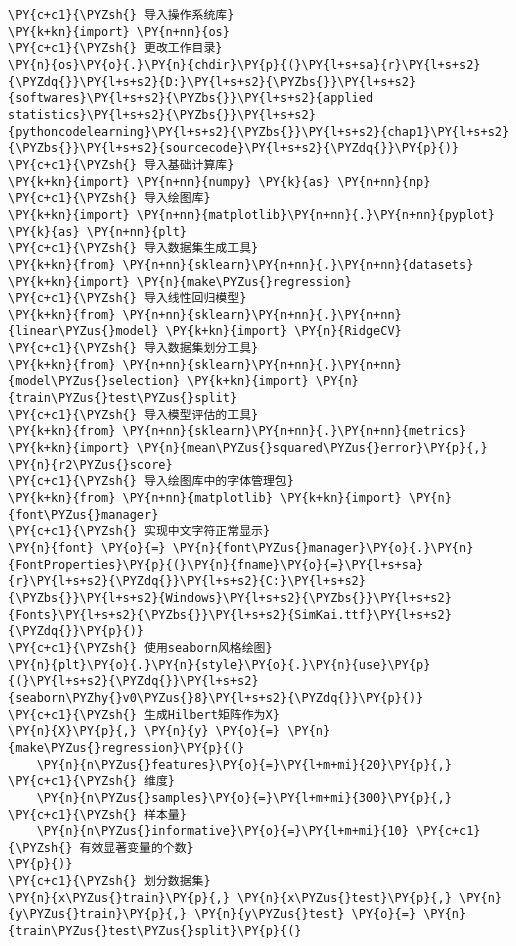 \begin{Verbatim}[commandchars=\\\{\}]
\PY{c+c1}{\PYZsh{} 导入操作系统库}
\PY{k+kn}{import} \PY{n+nn}{os}
\PY{c+c1}{\PYZsh{} 更改工作目录}
\PY{n}{os}\PY{o}{.}\PY{n}{chdir}\PY{p}{(}\PY{l+s+sa}{r}\PY{l+s+s2}{\PYZdq{}}\PY{l+s+s2}{D:}\PY{l+s+s2}{\PYZbs{}}\PY{l+s+s2}{softwares}\PY{l+s+s2}{\PYZbs{}}\PY{l+s+s2}{applied statistics}\PY{l+s+s2}{\PYZbs{}}\PY{l+s+s2}{pythoncodelearning}\PY{l+s+s2}{\PYZbs{}}\PY{l+s+s2}{chap1}\PY{l+s+s2}{\PYZbs{}}\PY{l+s+s2}{sourcecode}\PY{l+s+s2}{\PYZdq{}}\PY{p}{)}
\PY{c+c1}{\PYZsh{} 导入基础计算库}
\PY{k+kn}{import} \PY{n+nn}{numpy} \PY{k}{as} \PY{n+nn}{np}
\PY{c+c1}{\PYZsh{} 导入绘图库}
\PY{k+kn}{import} \PY{n+nn}{matplotlib}\PY{n+nn}{.}\PY{n+nn}{pyplot} \PY{k}{as} \PY{n+nn}{plt}
\PY{c+c1}{\PYZsh{} 导入数据集生成工具}
\PY{k+kn}{from} \PY{n+nn}{sklearn}\PY{n+nn}{.}\PY{n+nn}{datasets} \PY{k+kn}{import} \PY{n}{make\PYZus{}regression}
\PY{c+c1}{\PYZsh{} 导入线性回归模型}
\PY{k+kn}{from} \PY{n+nn}{sklearn}\PY{n+nn}{.}\PY{n+nn}{linear\PYZus{}model} \PY{k+kn}{import} \PY{n}{RidgeCV}
\PY{c+c1}{\PYZsh{} 导入数据集划分工具}
\PY{k+kn}{from} \PY{n+nn}{sklearn}\PY{n+nn}{.}\PY{n+nn}{model\PYZus{}selection} \PY{k+kn}{import} \PY{n}{train\PYZus{}test\PYZus{}split}
\PY{c+c1}{\PYZsh{} 导入模型评估的工具}
\PY{k+kn}{from} \PY{n+nn}{sklearn}\PY{n+nn}{.}\PY{n+nn}{metrics} \PY{k+kn}{import} \PY{n}{mean\PYZus{}squared\PYZus{}error}\PY{p}{,} \PY{n}{r2\PYZus{}score}
\PY{c+c1}{\PYZsh{} 导入绘图库中的字体管理包}
\PY{k+kn}{from} \PY{n+nn}{matplotlib} \PY{k+kn}{import} \PY{n}{font\PYZus{}manager}
\PY{c+c1}{\PYZsh{} 实现中文字符正常显示}
\PY{n}{font} \PY{o}{=} \PY{n}{font\PYZus{}manager}\PY{o}{.}\PY{n}{FontProperties}\PY{p}{(}\PY{n}{fname}\PY{o}{=}\PY{l+s+sa}{r}\PY{l+s+s2}{\PYZdq{}}\PY{l+s+s2}{C:}\PY{l+s+s2}{\PYZbs{}}\PY{l+s+s2}{Windows}\PY{l+s+s2}{\PYZbs{}}\PY{l+s+s2}{Fonts}\PY{l+s+s2}{\PYZbs{}}\PY{l+s+s2}{SimKai.ttf}\PY{l+s+s2}{\PYZdq{}}\PY{p}{)}
\PY{c+c1}{\PYZsh{} 使用seaborn风格绘图}
\PY{n}{plt}\PY{o}{.}\PY{n}{style}\PY{o}{.}\PY{n}{use}\PY{p}{(}\PY{l+s+s2}{\PYZdq{}}\PY{l+s+s2}{seaborn\PYZhy{}v0\PYZus{}8}\PY{l+s+s2}{\PYZdq{}}\PY{p}{)}
\PY{c+c1}{\PYZsh{} 生成Hilbert矩阵作为X}
\PY{n}{X}\PY{p}{,} \PY{n}{y} \PY{o}{=} \PY{n}{make\PYZus{}regression}\PY{p}{(}
    \PY{n}{n\PYZus{}features}\PY{o}{=}\PY{l+m+mi}{20}\PY{p}{,} \PY{c+c1}{\PYZsh{} 维度}
    \PY{n}{n\PYZus{}samples}\PY{o}{=}\PY{l+m+mi}{300}\PY{p}{,} \PY{c+c1}{\PYZsh{} 样本量}
    \PY{n}{n\PYZus{}informative}\PY{o}{=}\PY{l+m+mi}{10} \PY{c+c1}{\PYZsh{} 有效显著变量的个数}
\PY{p}{)}
\PY{c+c1}{\PYZsh{} 划分数据集}
\PY{n}{x\PYZus{}train}\PY{p}{,} \PY{n}{x\PYZus{}test}\PY{p}{,} \PY{n}{y\PYZus{}train}\PY{p}{,} \PY{n}{y\PYZus{}test} \PY{o}{=} \PY{n}{train\PYZus{}test\PYZus{}split}\PY{p}{(}

\end{Verbatim}
